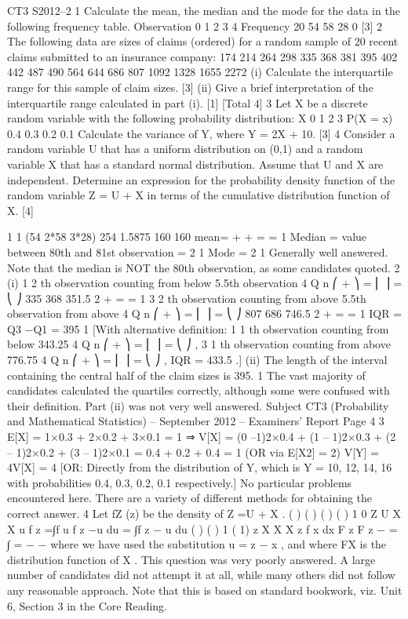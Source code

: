 CT3 S2012–2
1 Calculate the mean, the median and the mode for the data in the following frequency
table.
Observation 0 1 2 3 4
Frequency 20 54 58 28 0
[3]
2 The following data are sizes of claims (ordered) for a random sample of 20 recent
claims submitted to an insurance company:
  174 214 264 298 335 368 381 395 402 442
487 490 564 644 686 807 1092 1328 1655 2272
(i) Calculate the interquartile range for this sample of claim sizes. [3]
(ii) Give a brief interpretation of the interquartile range calculated in part (i). [1]
[Total 4]
3 Let X be a discrete random variable with the following probability distribution:
  X 0 1 2 3
P(X = x) 0.4 0.3 0.2 0.1
Calculate the variance of Y, where Y = 2X + 10. [3]
4 Consider a random variable U that has a uniform distribution on (0,1) and a random
variable X that has a standard normal distribution. Assume that U and X are
independent.
Determine an expression for the probability density function of the random variable Z
= U + X in terms of the cumulative distribution function of X. [4]



1 1 (54 2*58 3*28) 254 1.5875
160 160
mean= + + = = 1
Median = value between 80th and 81st observation = 2 1
Mode = 2 1
Generally well answered. Note that the median is NOT the 80th observation, as some
candidates quoted.
2 (i) 1
2 th observation counting from below 5.5th observation
4
Q n
⎛ + ⎞ = ⎜ ⎟ =
  ⎝ ⎠
335 368 351.5
2
+
  = = 1
3
2 th observation counting from above 5.5th observation from above
4
Q n
⎛ + ⎞ = ⎜ ⎟ =
  ⎝ ⎠
807 686 746.5
2
+
  = = 1
IQR = Q3 −Q1 = 395 1
[With alternative definition:
    1
  1 th observation counting from below 343.25
  4
  Q n
  ⎛ + ⎞ = ⎜ ⎟ =
    ⎝ ⎠
  ,
  3
  1 th observation counting from above 776.75
  4
  Q n
  ⎛ + ⎞ = ⎜ ⎟ =
    ⎝ ⎠
  , IQR = 433.5 .]
(ii) The length of the interval containing the central half of the claim sizes is 395.
1
The vast majority of candidates calculated the quartiles correctly, although some were
confused with their definition. Part (ii) was not very well answered.
Subject CT3 (Probability and Mathematical Statistics) – September 2012 – Examiners’ Report
Page 4
3 E[X] = 1×0.3 + 2×0.2 + 3×0.1 = 1
⇒ V[X] = (0 –1)2×0.4 + (1 – 1)2×0.3 + (2 – 1)2×0.2 + (3 – 1)2×0.1
= 0.4 + 0.2 + 0.4 = 1
(OR via E[X2] = 2)
V[Y] = 4V[X] = 4
[OR: Directly from the distribution of Y, which is Y = 10, 12, 14, 16 with
  probabilities 0.4, 0.3, 0.2, 0.1 respectively.]
No particular problems encountered here. There are a variety of different methods for
obtaining the correct answer.
4 Let fZ (z) be the density of Z =U + X .
( ) ( ) ( ) ( )
1
0
Z U X X
u
f z =∫f u f z −u du = ∫f z − u du
( ) ( )
1
( 1)
z
X X X
z
f x dx F z F z
−
= ∫ = − −
where we have used the substitution u = z − x , and where FX is the distribution
function of X .
This question was very poorly answered. A large number of candidates did not attempt it at
all, while many others did not follow any reasonable approach. Note that this is based on
standard bookwork, viz. Unit 6, Section 3 in the Core Reading.
